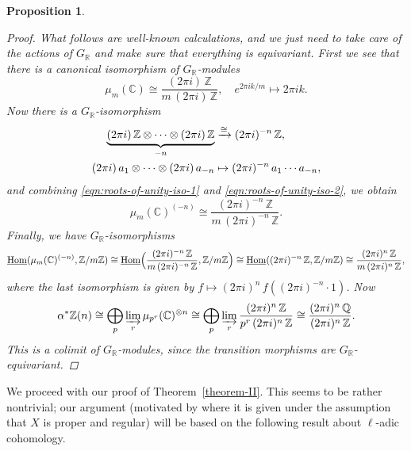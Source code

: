 \documentclass{article}
\DeclareMathOperator{\Hom}{Hom}
\newcommand{\CC}{\mathbb{C}}
\newcommand{\QQ}{\mathbb{Q}}
\newcommand{\RR}{\mathbb{R}}
\newcommand{\ZZ}{\mathbb{Z}}
\newcommand{\iHom}{\underline{\Hom}}
\newtheorem{proposition}[theorem]{Proposition}
\theoremstyle{definition}
\numberwithin{equation}{section}
\begin{document}
\begin{proposition}
\begin{proof}
    What follows are well-known calculations, and we just need to take care of
    the actions of $G_\RR$ and make sure that everything is equivariant. First
    we see that there is a canonical isomorphism of $G_\RR$-modules
    \begin{equation}
      \label{eqn:roots-of-unity-iso-1}
      \mu_m (\CC) \cong \frac{(2\pi i) \, \ZZ}{m\,(2\pi i)\,\ZZ}, \quad
      e^{2\pi i k/m} \mapsto 2\pi i k.
    \end{equation}
    Now there is a $G_\RR$-isomorphism
    \begin{align}
      \label{eqn:roots-of-unity-iso-2}
      \underbrace{(2\pi i)\,\ZZ\otimes\cdots\otimes (2\pi i)\,\ZZ}_{-n} & \xrightarrow{\cong} (2\pi i)^{-n}\,\ZZ,\\
      \notag (2\pi i)\,a_1\otimes\cdots\otimes (2\pi i)\,a_{-n} & \mapsto (2\pi i)^{-n}\,a_1\cdots a_{-n},
    \end{align}
    and combining \eqref{eqn:roots-of-unity-iso-1}
    and \eqref{eqn:roots-of-unity-iso-2}, we obtain
    $$\mu_m (\CC)^{(-n)} \cong \frac{(2\pi i)^{-n} \, \ZZ}{m\,(2\pi i)^{-n}\,\ZZ}.$$
    Finally, we have $G_\RR$-isomorphisms
    \[ \iHom (\mu_m (\CC)^{(-n)}, \ZZ/m\ZZ) \cong
    \iHom \Bigl(\frac{(2\pi i)^{-n} \, \ZZ}{m\,(2\pi i)^{-n}\,\ZZ}, \ZZ/m\ZZ\Bigr) \cong
    \iHom ((2\pi i)^{-n}\,\ZZ, \ZZ/m\ZZ) \cong
    \frac{(2\pi i)^n\,\ZZ}{m\,(2\pi i)^n\,\ZZ}, \]
    where the last isomorphism is given by
    $f \mapsto (2\pi i)^n \, f ((2\pi i)^{-n}\cdot 1)$.
    Now
    \[ \alpha^* \ZZ (n) \cong
    \bigoplus_p \varinjlim_r \mu_{p^r} (\CC)^{\otimes n} \cong
    \bigoplus_p \varinjlim_r \frac{(2\pi i)^n\,\ZZ}{p^r\,(2\pi i)^n\,\ZZ} \cong
    \frac{(2\pi i)^n\,\QQ}{(2\pi i)^n\,\ZZ}. \]
    This is a colimit of $G_\RR$-modules, since the transition morphisms are
    $G_\RR$-equivariant.
  \end{proof}
\end{proposition}

We proceed with our proof of Theorem~\ref{theorem-II}. This seems to be rather
nontrivial; our argument (motivated by \cite{Flach-Morin-2018} where it is given
under the assumption that $X$ is proper and regular) will be based on the
following result about $\ell$-adic cohomology.
\end{document}
